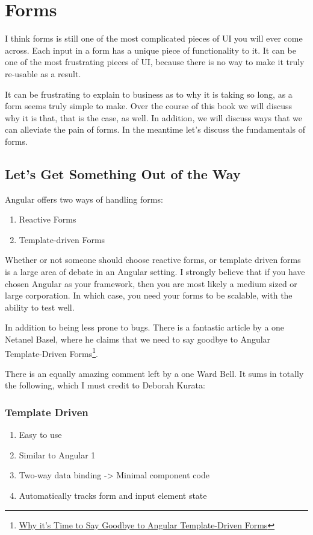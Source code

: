 
\chapter{ Forms }

I think forms is still one of the most complicated pieces of UI you will ever come across. Each input in a form has a unique piece of functionality to it. It can be one of the most frustrating pieces of UI, because there is no way to make it truly re-usable as a result. 

It can be frustrating to explain to business as to why it is taking so long, as a form seems truly simple to make. Over the course of this book we will discuss why it is that, that is the case, as well. In addition, we will discuss ways that we can alleviate the pain of forms. In the meantime let's discuss the fundamentals of forms. 

\section{ Let's Get Something Out of the Way }

Angular offers two ways of handling forms: 
\begin{enumerate}
  \item Reactive Forms 
  \item Template-driven Forms
\end{enumerate}

Whether or not someone should choose reactive forms, or template driven forms is a large area of debate in an Angular setting. I strongly believe that if you have chosen Angular as your framework, then you are most likely a medium sized or large corporation. In which case, you need your forms to be scalable, with the ability to test well. 

In addition to being less prone to bugs. There is a fantastic article by a one Netanel Basel, where he claims that we need to say goodbye to Angular Template-Driven Forms\footnote{\href{https://netbasal.com/why-its-time-to-say-goodbye-to-angular-template-driven-forms-350c11d004b}{Why it's Time to Say Goodbye to Angular Template-Driven Forms}}.

There is an equally amazing comment left by a one Ward Bell. It sums in totally the following, which I must credit to Deborah Kurata: 

\subsection{Template Driven}
\begin{enumerate}
  \item Easy to use
  \item Similar to Angular 1
  \item Two-way data binding -> Minimal component code
  \item Automatically tracks form and input element state
\end{enumerate}

